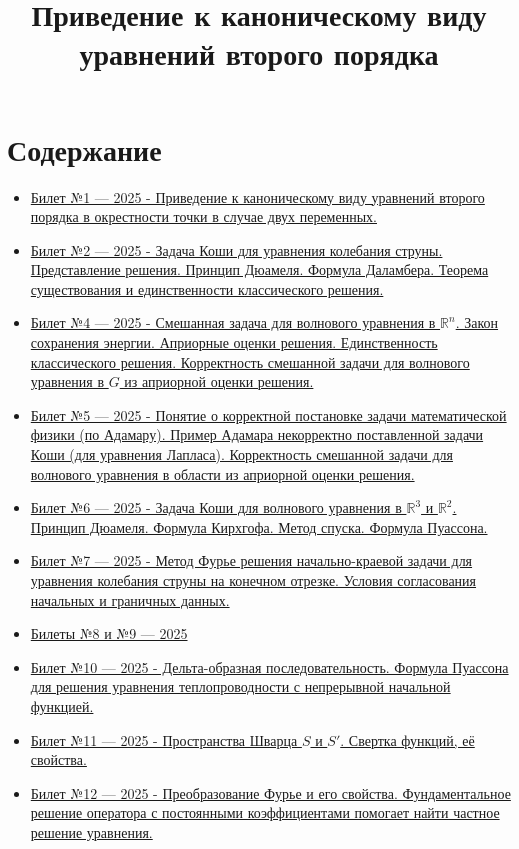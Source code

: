 \documentclass[12pt, a4paper]{article}
\title{Приведение к каноническому виду уравнений второго порядка}
\author{} %
\date{}   %
\begin{document}

\section*{Содержание}\label{toc}
\begin{itemize}
    \item \hyperref[sec:ticket1]{Билет №1 — 2025 - Приведение к каноническому виду уравнений второго порядка в окрестности точки в случае двух переменных.}
    \item \hyperref[sec:ticket2]{Билет №2 — 2025 - Задача Коши для уравнения колебания струны. Представление решения. Принцип Дюамеля. Формула Даламбера. Теорема существования и единственности классического решения.}
    \item \hyperref[sec:ticket4]{Билет №4 — 2025 - Смешанная задача для волнового уравнения в $\mathbb{R}^n$. Закон сохранения энергии. Априорные оценки решения. Единственность классического решения. Корректность смешанной задачи для волнового уравнения в $G$ из априорной оценки решения.}
    \item \hyperref[sec:ticket5]{Билет №5 — 2025 - Понятие о корректной постановке задачи математической физики (по Адамару). Пример Адамара некорректно поставленной задачи Коши (для уравнения Лапласа). Корректность смешанной задачи для волнового уравнения в области из априорной оценки решения.}
    \item \hyperref[sec:ticket6]{Билет №6 — 2025 - Задача Коши для волнового уравнения в $\mathbb{R}^3$ и $\mathbb{R}^2$. Принцип Дюамеля. Формула Кирхгофа. Метод спуска. Формула Пуассона.}
    \item \hyperref[sec:ticket7]{Билет №7 — 2025 - Метод Фурье решения начально-краевой задачи для уравнения колебания струны на конечном отрезке. Условия согласования начальных и граничных данных.}
    \item \hyperref[sec:ticket8_9]{Билеты №8 и №9 — 2025}
    \item \hyperref[sec:ticket10]{Билет №10 — 2025 - Дельта-образная последовательность. Формула Пуассона для решения уравнения теплопроводности с непрерывной начальной функцией.}
    \item \hyperref[sec:ticket11]{Билет №11 — 2025 - Пространства Шварца $S$ и $S'$. Свертка функций, её свойства.}
    \item \hyperref[sec:ticket12]{Билет №12 — 2025 - Преобразование Фурье и его свойства. Фундаментальное решение оператора с постоянными коэффициентами помогает найти частное решение уравнения.}

\end{itemize}
\end{document}
